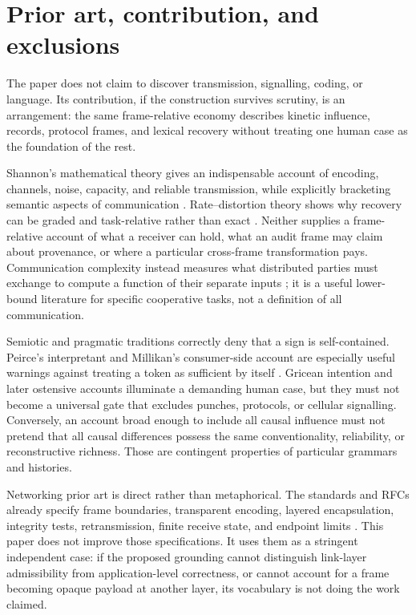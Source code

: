 \documentclass[11pt,a4paper]{article}
\theoremstyle{remark}\newtheorem{remark}[definition]{Remark}
\begin{document}
\section{Prior art, contribution, and exclusions}\label{sec:prior-art}

The paper does not claim to discover transmission, signalling, coding, or
language. Its contribution, if the construction survives scrutiny, is an
arrangement: the same frame-relative economy describes kinetic influence,
records, protocol frames, and lexical recovery without treating one human case as
the foundation of the rest.

Shannon's mathematical theory gives an indispensable account of encoding,
channels, noise, capacity, and reliable transmission, while explicitly bracketing
semantic aspects of communication \citep{shannon1948}. Rate--distortion theory
shows why recovery can be graded and task-relative rather than exact
\citep{coverthomas2006}. Neither supplies a frame-relative account of what a
receiver can hold, what an audit frame may claim about provenance, or where a
particular cross-frame transformation pays. Communication complexity instead
measures what distributed parties must exchange to compute a function of their
separate inputs \citep{yao1979,kushilevitznisan1997}; it is a useful lower-bound
literature for specific cooperative tasks, not a definition of all communication.

Semiotic and pragmatic traditions correctly deny that a sign is self-contained.
Peirce's interpretant and Millikan's consumer-side account are especially useful
warnings against treating a token as sufficient by itself \citep{peirce1931,millikan1984}.
Gricean intention and later ostensive accounts illuminate a demanding human case,
but they must not become a universal gate that excludes punches, protocols, or
cellular signalling. Conversely, an account broad enough to include all causal
influence must not pretend that all causal differences possess the same
conventionality, reliability, or reconstructive richness. Those are contingent
properties of particular grammars and histories.

Networking prior art is direct rather than metaphorical. The standards and RFCs
already specify frame boundaries, transparent encoding, layered encapsulation,
integrity tests, retransmission, finite receive state, and endpoint limits
\citep{ieee8023,simpson1994,postel1981,eddy2022,saltzer1984}. This paper does not
improve those specifications. It uses them as a stringent independent case: if
the proposed grounding cannot distinguish link-layer admissibility from
application-level correctness, or cannot account for a frame becoming opaque
payload at another layer, its vocabulary is not doing the work claimed.
\end{document}
